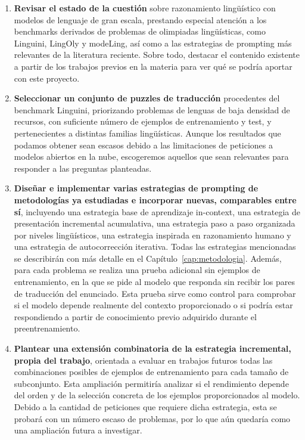 \begin{enumerate}
	
	\item \textbf{Revisar el estado de la cuestión} sobre razonamiento lingüístico con modelos de lenguaje de gran escala, prestando especial atención a los benchmarks derivados de problemas de olimpiadas lingüísticas, como Linguini, LingOly y modeLing, así como a las estrategias de prompting más relevantes de la literatura reciente. Sobre todo, destacar el contenido existente a partir de los trabajos previos en la materia para ver qué se podría aportar con este proyecto.
	
	\item \textbf{Seleccionar un conjunto de puzzles de traducción} procedentes del benchmark Linguini, priorizando problemas de lenguas de baja densidad de recursos, con suficiente número de ejemplos de entrenamiento y test, y pertenecientes a distintas familias lingüísticas. Aunque los resultados que podamos obtener sean escasos debido a las limitaciones de peticiones a modelos abiertos en la nube, escogeremos aquellos que sean relevantes para responder a las preguntas planteadas.
	
	\item \textbf{Diseñar e implementar varias estrategias de prompting de metodologías ya estudiadas e incorporar nuevas, comparables entre sí}, incluyendo una estrategia base de aprendizaje in-context, una estrategia de presentación incremental acumulativa, una estrategia paso a paso organizada por niveles lingüísticos, una estrategia inspirada en razonamiento humano y una estrategia de autocorrección iterativa. Todas las estrategias mencionadas se describirán con más detalle en el Capítulo~\ref{cap:metodologia}. Además, para cada problema se realiza una prueba adicional sin ejemplos de entrenamiento, en la que se pide al modelo que responda sin recibir los pares de traducción del enunciado. Esta prueba sirve como control para comprobar si el modelo depende realmente del contexto proporcionado o si podría estar respondiendo a partir de conocimiento previo adquirido durante el preentrenamiento.
	
	\item \textbf{Plantear una extensión combinatoria de la estrategia incremental, propia del trabajo}, orientada a evaluar en trabajos futuros todas las combinaciones posibles de ejemplos de entrenamiento para cada tamaño de subconjunto. Esta ampliación permitiría analizar si el rendimiento depende del orden y de la selección concreta de los ejemplos proporcionados al modelo. Debido a la cantidad de peticiones que requiere dicha estrategia, esta se probará con un número escaso de problemas, por lo que aún quedaría como una ampliación futura a investigar.
	

\end{enumerate}
